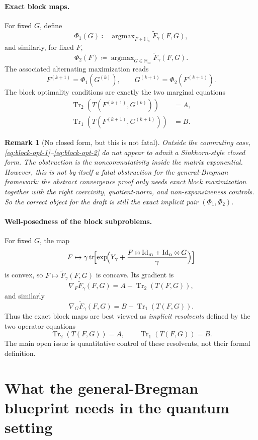 \documentclass[11pt]{article}
\newcommand{\Id}{\mathrm{Id}}
\newcommand{\tr}{\operatorname{tr}}
\newcommand{\Trone}{\operatorname{Tr}_{1}}
\newcommand{\Trtwo}{\operatorname{Tr}_{2}}
\newcommand{\argmax}{\operatorname{argmax}}
\newcommand{\eqdef}{\coloneqq}
\newcommand{\Hh}{\mathbb{H}}
\newcommand{\Ee}{\widetilde F}
\theoremstyle{plain}
\newtheorem{remark}{Remark}[section]
\begin{document}
\paragraph{Exact block maps.}
For fixed $G$, define
\[
\Phi_1(G) \eqdef \argmax_{F \in \Hh_n} \Ee_\gamma(F,G),
\]
and similarly, for fixed $F$,
\[
\Phi_2(F) \eqdef \argmax_{G \in \Hh_m} \Ee_\gamma(F,G).
\]
The associated alternating maximization reads
\[
F^{(k+1)}=\Phi_1(G^{(k)}),
\qquad
G^{(k+1)}=\Phi_2(F^{(k+1)}).
\]
The block optimality conditions are exactly the two marginal equations
\begin{align}
\Trtwo(T(F^{(k+1)},G^{(k)})) &= A,
\label{eq:block-opt-1}\\
\Trone(T(F^{(k+1)},G^{(k+1)})) &= B.
\label{eq:block-opt-2}
\end{align}

\begin{remark}[No closed form, but this is not fatal]
\label{rem:no-closed-form}
Outside the commuting case, \eqref{eq:block-opt-1}--\eqref{eq:block-opt-2} do not appear to admit a Sinkhorn-style closed form.
The obstruction is the noncommutativity inside the matrix exponential.
However, this is \emph{not} by itself a fatal obstruction for the general-Bregman framework: the abstract convergence proof only needs exact block maximization together with the right coercivity, quotient-norm, and non-expansiveness controls.
So the correct object for the draft is still the exact implicit pair $(\Phi_1,\Phi_2)$.
\end{remark}

\paragraph{Well-posedness of the block subproblems.}
For fixed $G$, the map
\[
F \mapsto \gamma \tr\!\Bigl[\exp\!\Bigl(Y_\gamma + \frac{F \otimes \Id_m + \Id_n \otimes G}{\gamma}\Bigr)\Bigr]
\]
is convex, so $F \mapsto \Ee_\gamma(F,G)$ is concave.
Its gradient is
\[
\nabla_F \Ee_\gamma(F,G)=A-\Trtwo(T(F,G)),
\]
and similarly
\[
\nabla_G \Ee_\gamma(F,G)=B-\Trone(T(F,G)).
\]
Thus the exact block maps are best viewed as \emph{implicit resolvents} defined by the two operator equations
\[
\Trtwo(T(F,G))=A,
\qquad
\Trone(T(F,G))=B.
\]
The main open issue is quantitative control of these resolvents, not their formal definition.

\section{What the general-Bregman blueprint needs in the quantum setting}
\end{document}
